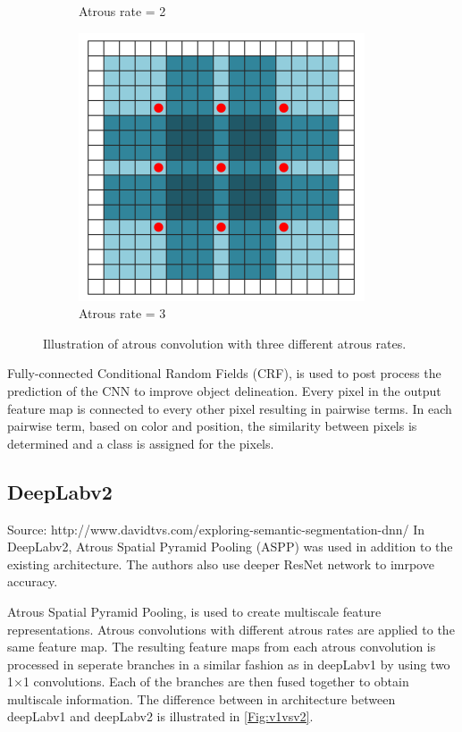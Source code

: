 \begin{figure}[!htb]
\begin{subfigure}{.3\textwidth}
			\caption{Atrous rate = 2}
		\end{subfigure}
		\begin{subfigure}{.3\textwidth}
			\centering
			\includegraphics[width=1\linewidth]{images/r_3}
			\caption{Atrous rate = 3}
		\end{subfigure}
		\caption{Illustration of atrous convolution with three different atrous rates.}
		\label{Fig:atconv}
	\end{figure}
	
Fully-connected Conditional Random Fields (CRF), is used to post process the prediction of the CNN to improve object delineation. Every pixel in the output feature map is connected to every other pixel resulting in pairwise terms. In each pairwise term, based on color and position, the similarity between pixels is determined and a class is assigned for the pixels.


\subsection{DeepLabv2}

Source: http://www.davidtvs.com/exploring-semantic-segmentation-dnn/
In DeepLabv2, Atrous Spatial Pyramid Pooling (ASPP) was used in addition to the existing architecture. The authors also use deeper ResNet network to imrpove accuracy.

Atrous Spatial Pyramid Pooling, is used to create multiscale feature representations. Atrous convolutions with different atrous rates are applied to the same feature map. The resulting feature maps from each atrous convolution is processed in seperate branches in a similar fashion as in deepLabv1 by using two 1$\times$1 convolutions. Each of the branches are then fused together to obtain multiscale information. The difference between in architecture between deepLabv1 and deepLabv2 is illustrated in \ref{Fig:v1vsv2}.

